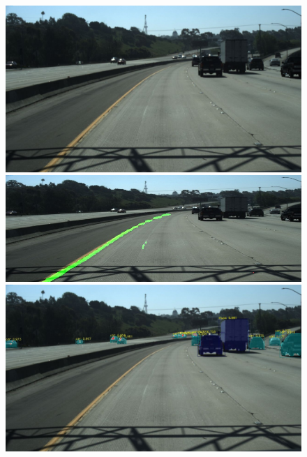 \documentclass[runningheads]{llncs}
\begin{document}
\begin{figure}[!htb]
	\includegraphics[width=\linewidth]{result/16.jpg}
	\endminipage\hfill
	\includegraphics[width=\linewidth]{result/16-lane.jpg}
	\endminipage\hfill
	\includegraphics[width=\linewidth]{result/16-obj.jpg}
	\endminipage


\end{figure}
\end{document}
